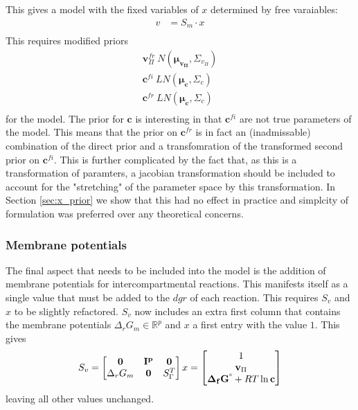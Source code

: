 \documentclass[10pt,letterpaper]{article}
\newcommand{\dgf}{\Delta_fG}
\newcommand{\sdgf}{\Delta_fG^{\degree}}
\newcommand{\dgr}{\Delta_rG}
\newcommand{\bdgf}{\mathbf{\dgf}}
\newcommand{\bsdgf}{\mathbf{\sdgf}}
\newcommand{\bc}{\mathbf{c}}
\newcommand{\bv}{\mathbf{v}}
\begin{document}
This gives a model with the fixed variables of $x$ determined by free varaiables:
\begin{align}
    v &= S_m\cdot x\\
\end{align}
This requires modified priors
\begin{align}
    \bv_\Pi^{fr} ~ N(\mathbf{\mu_{v_{\Pi}}}, \Sigma_{v_{\Pi}}) \\
    \bc^{fi} ~ LN(\mathbf{\mu_c}, \Sigma_c) \\
    \bc^{fr} ~ LN(\mathbf{\mu_c}, \Sigma_c) \\
\end{align}
for the model.
The prior for $\bc$ is interesting in that $\bc^{fi}$ are not true parameters of the model.
This means that the prior on $\bc^{fr}$ is in fact an (inadmissable) combination of the direct prior and a transfomration of the transformed second prior on $\bc^{fi}$.
This is further complicated by the fact that, as this is a transformation of paramters, a jacobian transformation should be included to account for the "stretching" of the parameter space by this transformation.
In Section \ref{sec:x_prior} we show that this had no effect in practice and simplcity of formulation was preferred over any theoretical concerns.

\subsubsection{Membrane potentials}
The final aspect that needs to be included into the model is the addition of membrane potentials for intercompartmental reactions.
This manifests itself as a single value that must be added to the $dgr$ of each reaction.
This requires $S_v$ and $x$ to be slightly refactored.
$S_v$ now includes an extra first column that contains the membrane potentials $\dgr_m \in \mathbb{R}^p$ and $x$ a first entry with the value $1$.
This gives
\[
    S_v = \begin{bmatrix}
              \mathbf{0} & \mathbf{I^p} & \mathbf{0} \\
              \dgr_m & \mathbf{0} & S_{\Gamma}^T\\
          \end{bmatrix} \\
    x = \begin{bmatrix}
            1 \\
            \bv_\Pi \\
            \bsdgf + RT\ln{\bc} \\
        \end{bmatrix}
\]
leaving all other values unchanged.
\end{document}
